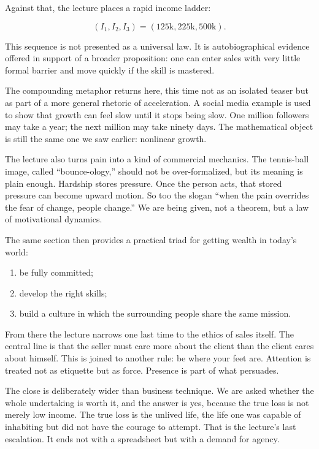 Against that, the lecture places a rapid income ladder:

\begin{equation}
(I_1, I_2, I_3) = (125\text{k}, 225\text{k}, 500\text{k}).
\end{equation}

This sequence is not presented as a universal law. It is autobiographical evidence offered in support of a broader proposition: one can enter sales with very little formal barrier and move quickly if the skill is mastered.

The compounding metaphor returns here, this time not as an isolated teaser but as part of a more general rhetoric of acceleration. A social media example is used to show that growth can feel slow until it stops being slow. One million followers may take a year; the next million may take ninety days. The mathematical object is still the same one we saw earlier: nonlinear growth.

The lecture also turns pain into a kind of commercial mechanics. The tennis-ball image, called ``bounce-ology,'' should not be over-formalized, but its meaning is plain enough. Hardship stores pressure. Once the person acts, that stored pressure can become upward motion. So too the slogan ``when the pain overrides the fear of change, people change.'' We are being given, not a theorem, but a law of motivational dynamics.

The same section then provides a practical triad for getting wealth in today's world:
\begin{enumerate}
\item be fully committed;
\item develop the right skills;
\item build a culture in which the surrounding people share the same mission.
\end{enumerate}

From there the lecture narrows one last time to the ethics of sales itself. The central line is that the seller must care more about the client than the client cares about himself. This is joined to another rule: be where your feet are. Attention is treated not as etiquette but as force. Presence is part of what persuades.

The close is deliberately wider than business technique. We are asked whether the whole undertaking is worth it, and the answer is yes, because the true loss is not merely low income. The true loss is the unlived life, the life one was capable of inhabiting but did not have the courage to attempt. That is the lecture's last escalation. It ends not with a spreadsheet but with a demand for agency.

